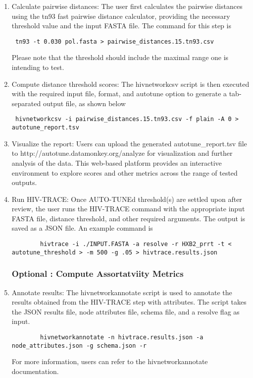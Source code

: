\documentclass[utf8]{FrontiersinHarvard} %
\begin{document}
\begin{enumerate}

\item{ Calculate pairwise distances: The user first calculates the pairwise distances using the tn93 fast pairwise distance calculator, providing the necessary threshold value and the input FASTA file. The command for this step is 
\begin{verbatim}
 tn93 -t 0.030 pol.fasta > pairwise_distances.15.tn93.csv
\end{verbatim}

Please note that the threshold should include the maximal range one is intending to test.
}

\item {Compute distance threshold scores: The hivnetworkcsv script is then executed with the required input file, format, and autotune option to generate a tab-separated output file, as shown below
\begin{verbatim}
 hivnetworkcsv -i pairwise_distances.15.tn93.csv -f plain -A 0 > autotune_report.tsv
\end{verbatim}
}

\item {Visualize the report: Users can upload the generated autotune\_report.tsv file to http://autotune.datamonkey.org/analyze for visualization and further analysis of the data. This web-based platform provides an interactive environment to explore scores and other metrics across the range of tested outputs. }

\item {Run HIV-TRACE: Once AUTO-TUNEd threshold(s) are settled upon after review, the user runs the HIV-TRACE command with the appropriate input FASTA file, distance threshold, and other required arguments. The output is saved as a JSON file. An example command is
	\begin{verbatim}
 		hivtrace -i ./INPUT.FASTA -a resolve -r HXB2_prrt -t < autotune_threshold > -m 500 -g .05 > hivtrace.results.json
	\end{verbatim}
}

\subsubsection{Optional : Compute Assortatviity Metrics}

\item{ Annotate results: The hivnetworkannotate script is used to annotate the results obtained from the HIV-TRACE step with attributes. The script takes the JSON results file, node attributes file, schema file, and a resolve flag as input.
	\begin{verbatim}
 		hivnetworkannotate -n hivtrace.results.json -a node_attributes.json -g schema.json -r
	\end{verbatim}
 For more information, users can refer to the hivnetworkannotate documentation.
}


\end{enumerate}
\end{document}
